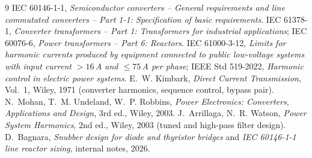 \documentclass[11pt,a4paper]{article}
\begin{document}
\begin{thebibliography}{9}
 IEC 60146-1-1, \emph{Semiconductor converters -- General requirements and line commutated converters -- Part 1-1: Specification of basic requirements}.
 IEC 61378-1, \emph{Converter transformers -- Part 1: Transformers for industrial applications}; IEC 60076-6, \emph{Power transformers -- Part 6: Reactors}.
 IEC 61000-3-12, \emph{Limits for harmonic currents produced by equipment connected to public low-voltage systems with input current $>16$\,A and $\le 75$\,A per phase}; IEEE Std 519-2022, \emph{Harmonic control in electric power systems}.
 E.~W. Kimbark, \emph{Direct Current Transmission}, Vol.~1, Wiley, 1971 (converter harmonics, sequence control, bypass pair).
 N.~Mohan, T.~M. Undeland, W.~P. Robbins, \emph{Power Electronics: Converters, Applications and Design}, 3rd ed., Wiley, 2003.
 J.~Arrillaga, N.~R. Watson, \emph{Power System Harmonics}, 2nd ed., Wiley, 2003 (tuned and high-pass filter design).
 D.~Bagnara, \emph{Snubber design for diode and thyristor bridges} and \emph{IEC 60146-1-1 line reactor sizing}, internal notes, 2026.
\end{thebibliography}
\end{document}
